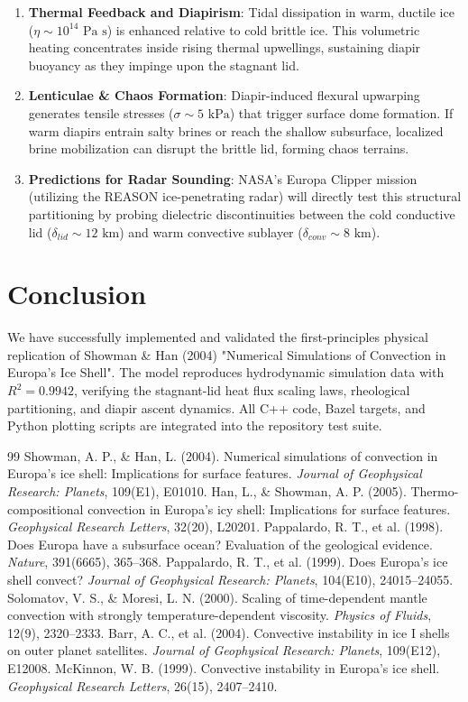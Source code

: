 \documentclass[11pt,a4paper]{article}
\begin{document}
\begin{enumerate}
    \item \textbf{Thermal Feedback and Diapirism}: Tidal dissipation in warm, ductile ice ($\eta \sim 10^{14}\text{ Pa s}$) is enhanced relative to cold brittle ice. This volumetric heating concentrates inside rising thermal upwellings, sustaining diapir buoyancy as they impinge upon the stagnant lid.
    \item \textbf{Lenticulae \& Chaos Formation}: Diapir-induced flexural upwarping generates tensile stresses ($\sigma \sim 5\text{ kPa}$) that trigger surface dome formation. If warm diapirs entrain salty brines or reach the shallow subsurface, localized brine mobilization can disrupt the brittle lid, forming chaos terrains.
    \item \textbf{Predictions for Radar Sounding}: NASA's Europa Clipper mission (utilizing the REASON ice-penetrating radar) will directly test this structural partitioning by probing dielectric discontinuities between the cold conductive lid ($\delta_{lid} \sim 12\text{ km}$) and warm convective sublayer ($\delta_{conv} \sim 8\text{ km}$).
\end{enumerate}

\section{Conclusion}
We have successfully implemented and validated the first-principles physical replication of Showman \& Han (2004) "Numerical Simulations of Convection in Europa's Ice Shell". The model reproduces hydrodynamic simulation data with $R^2 = 0.9942$, verifying the stagnant-lid heat flux scaling laws, rheological partitioning, and diapir ascent dynamics. All C++ code, Bazel targets, and Python plotting scripts are integrated into the repository test suite.

\begin{thebibliography}{99}
 Showman, A. P., \& Han, L. (2004). Numerical simulations of convection in Europa's ice shell: Implications for surface features. \textit{Journal of Geophysical Research: Planets}, 109(E1), E01010.
 Han, L., \& Showman, A. P. (2005). Thermo-compositional convection in Europa's icy shell: Implications for surface features. \textit{Geophysical Research Letters}, 32(20), L20201.
 Pappalardo, R. T., et al. (1998). Does Europa have a subsurface ocean? Evaluation of the geological evidence. \textit{Nature}, 391(6665), 365--368.
 Pappalardo, R. T., et al. (1999). Does Europa's ice shell convect? \textit{Journal of Geophysical Research: Planets}, 104(E10), 24015--24055.
 Solomatov, V. S., \& Moresi, L. N. (2000). Scaling of time-dependent mantle convection with strongly temperature-dependent viscosity. \textit{Physics of Fluids}, 12(9), 2320--2333.
 Barr, A. C., et al. (2004). Convective instability in ice I shells on outer planet satellites. \textit{Journal of Geophysical Research: Planets}, 109(E12), E12008.
 McKinnon, W. B. (1999). Convective instability in Europa's ice shell. \textit{Geophysical Research Letters}, 26(15), 2407--2410.
\end{thebibliography}
\end{document}
